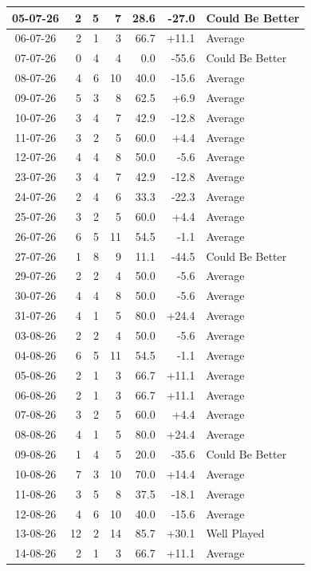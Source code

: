 \documentclass[journal]{IEEEtran}
\numberwithin{equation}{subsection}
\begin{document}
\begin{longtable}{|c|r|r|r|r|r|l|}
05-07-26 & 2 & 5 & 7 & 28.6 & -27.0 & Could Be Better\\ \hline
06-07-26 & 2 & 1 & 3 & 66.7 & +11.1 & Average\\ \hline
07-07-26 & 0 & 4 & 4 & 0.0 & -55.6 & Could Be Better\\ \hline
08-07-26 & 4 & 6 & 10 & 40.0 & -15.6 & Average\\ \hline
09-07-26 & 5 & 3 & 8 & 62.5 & +6.9 & Average\\ \hline
10-07-26 & 3 & 4 & 7 & 42.9 & -12.8 & Average\\ \hline
11-07-26 & 3 & 2 & 5 & 60.0 & +4.4 & Average\\ \hline
12-07-26 & 4 & 4 & 8 & 50.0 & -5.6 & Average\\ \hline
23-07-26 & 3 & 4 & 7 & 42.9 & -12.8 & Average\\ \hline
24-07-26 & 2 & 4 & 6 & 33.3 & -22.3 & Average\\ \hline
25-07-26 & 3 & 2 & 5 & 60.0 & +4.4 & Average\\ \hline
26-07-26 & 6 & 5 & 11 & 54.5 & -1.1 & Average\\ \hline
27-07-26 & 1 & 8 & 9 & 11.1 & -44.5 & Could Be Better\\ \hline
29-07-26 & 2 & 2 & 4 & 50.0 & -5.6 & Average\\ \hline
30-07-26 & 4 & 4 & 8 & 50.0 & -5.6 & Average\\ \hline
31-07-26 & 4 & 1 & 5 & 80.0 & +24.4 & Average\\ \hline
03-08-26 & 2 & 2 & 4 & 50.0 & -5.6 & Average\\ \hline
04-08-26 & 6 & 5 & 11 & 54.5 & -1.1 & Average\\ \hline
05-08-26 & 2 & 1 & 3 & 66.7 & +11.1 & Average\\ \hline
06-08-26 & 2 & 1 & 3 & 66.7 & +11.1 & Average\\ \hline
07-08-26 & 3 & 2 & 5 & 60.0 & +4.4 & Average\\ \hline
08-08-26 & 4 & 1 & 5 & 80.0 & +24.4 & Average\\ \hline
09-08-26 & 1 & 4 & 5 & 20.0 & -35.6 & Could Be Better\\ \hline
10-08-26 & 7 & 3 & 10 & 70.0 & +14.4 & Average\\ \hline
11-08-26 & 3 & 5 & 8 & 37.5 & -18.1 & Average\\ \hline
12-08-26 & 4 & 6 & 10 & 40.0 & -15.6 & Average\\ \hline
13-08-26 & 12 & 2 & 14 & 85.7 & +30.1 & Well Played\\ \hline
14-08-26 & 2 & 1 & 3 & 66.7 & +11.1 & Average\\ \hline

\end{longtable}
\end{document}
